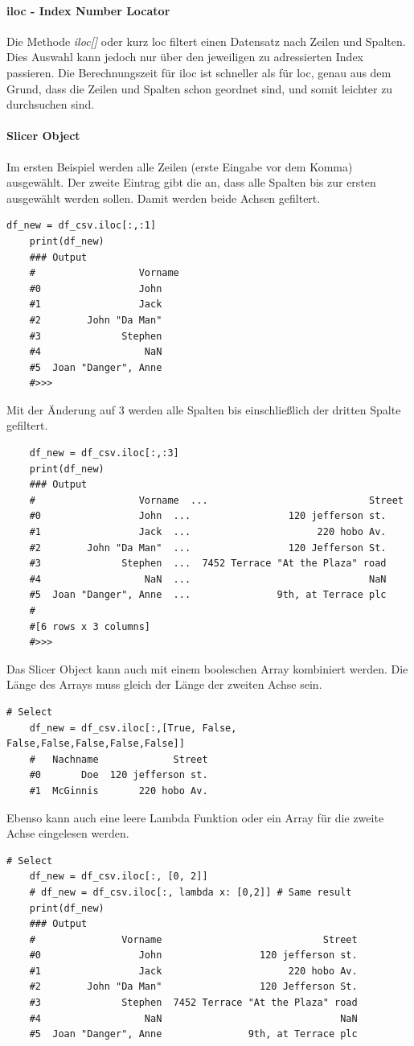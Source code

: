 \paragraph{iloc - Index Number Locator}
Die Methode \textit{iloc[]} oder kurz loc filtert einen Datensatz nach Zeilen und Spalten. Dies Auswahl kann jedoch nur über den jeweiligen zu adressierten Index passieren. Die Berechnungszeit für iloc ist schneller als für loc, genau aus dem Grund, dass die Zeilen und Spalten schon geordnet sind, und somit leichter zu durchsuchen sind.
\paragraph*{Slicer Object} 
Im ersten Beispiel werden alle Zeilen (erste Eingabe vor dem Komma) ausgewählt. Der zweite Eintrag gibt die an, dass alle Spalten bis zur ersten ausgewählt werden sollen. Damit werden beide Achsen gefiltert.
\begin{lstlisting}[style=python]
	df_new = df_csv.iloc[:,:1]
	print(df_new)
	### Output
	#	               Vorname
	#0                 John
	#1                 Jack
	#2        John "Da Man"
	#3              Stephen
	#4                  NaN
	#5  Joan "Danger", Anne
	#>>> 	
\end{lstlisting}

Mit der Änderung auf 3 werden alle Spalten bis einschließlich der dritten Spalte gefiltert.
\begin{lstlisting}
	df_new = df_csv.iloc[:,:3]
	print(df_new)
	### Output
	#	               Vorname  ...                            Street
	#0                 John  ...                 120 jefferson st.
	#1                 Jack  ...                      220 hobo Av.
	#2        John "Da Man"  ...                 120 Jefferson St.
	#3              Stephen  ...  7452 Terrace "At the Plaza" road
	#4                  NaN  ...                               NaN
	#5  Joan "Danger", Anne  ...               9th, at Terrace plc
	#
	#[6 rows x 3 columns]
	#>>> 
\end{lstlisting}
Das Slicer Object kann auch mit einem booleschen Array kombiniert werden. Die Länge des Arrays muss gleich der Länge der zweiten Achse sein.
\begin{lstlisting}[style=python]
	# Select 
	df_new = df_csv.iloc[:,[True, False, False,False,False,False,False]]
	#   Nachname             Street
	#0       Doe  120 jefferson st.
	#1  McGinnis       220 hobo Av.
\end{lstlisting}
Ebenso kann auch eine leere Lambda Funktion oder ein Array für die zweite Achse eingelesen werden.
\begin{lstlisting}[style=python]
	# Select 
	df_new = df_csv.iloc[:, [0, 2]]
	# df_new = df_csv.iloc[:, lambda x: [0,2]] # Same result
	print(df_new)
	### Output
	#               Vorname                            Street
	#0                 John                 120 jefferson st.
	#1                 Jack                      220 hobo Av.
	#2        John "Da Man"                 120 Jefferson St.
	#3              Stephen  7452 Terrace "At the Plaza" road
	#4                  NaN                               NaN
	#5  Joan "Danger", Anne               9th, at Terrace plc
\end{lstlisting}

